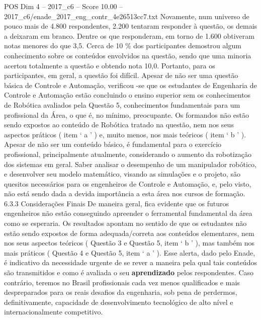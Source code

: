\begin{textsample}{POS Dim 4 – 2017\_c6 – Score 10.00 – 2017\_c6/enade\_2017\_eng\_contr\_4e26513cc7.txt}
Novamente, num universo de pouco mais de 4.800 respondentes, 2.200 tentaram responder à questão, os demais a deixaram em branco.
Dentre os que responderam, em torno de 1.600 obtiveram notas menores do que 3,5.
Cerca de 10 \% dos participantes demostrou algum conhecimento sobre os conteúdos envolvidos na questão, sendo que uma minoria acertou totalmente a questão e obtendo nota 10,0.
Portanto, para os participantes, em geral, a questão foi difícil.
Apesar de não ser uma questão básica de Controle e Automação, verificou -se que os estudantes de Engenharia de Controle e Automação estão concluindo o ensino superior sem os conhecimentos de Robótica avaliados pela Questão 5, conhecimentos fundamentais para um profissional da Área, o que é, no mínimo, preocupante.
Os formandos não estão sendo expostos ao conteúdo de Robótica tratado na questão, nem nos seus aspectos práticos ( item ‘ a ’ ) e, muito menos, nos mais teóricos ( item ‘ b ’ ).
Apesar de não ser um conteúdo básico, é fundamental para o exercício profissional, principalmente atualmente, considerando o aumento da robotização dos sistemas em geral.
Saber analisar o desempenho de um manipulador robótico, e desenvolver seu modelo matemático, visando as simulações e o projeto, são quesitos necessários para os engenheiros de Controle e Automação, e, pelo visto, não está sendo dada a devida importância a esta área nos cursos de formação. 6.3.3 Considerações Finais De maneira geral, fica evidente que os futuros engenheiros não estão conseguindo apreender o ferramental fundamental da área como se esperaria.
Os resultados apontam no sentido de que os estudantes não estão sendo expostos de forma adequada/correta aos conteúdos elementares, nem nos seus aspectos teóricos ( Questão 3 e Questão 5, item ‘ b ’ ), mas também nos mais práticos ( Questão 4 e Questão 5, item ‘ a ’ ).
Esse alerta, dado pelo Enade, é indicativo da necessidade urgente de se rever a maneira pela qual tais conteúdos são transmitidos e como é avaliada o seu \textbf{aprendizado} pelos respondentes.
Caso contrário, teremos no Brasil profissionais cada vez menos qualificados e mais despreparados para os reais desafios da engenharia, sob pena de perdermos, definitivamente, capacidade de desenvolvimento tecnológico de alto nível e internacionalmente competitivo.

\end{textsample}
